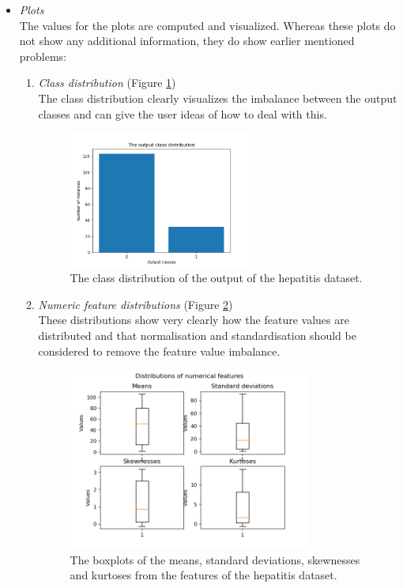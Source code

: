 \documentclass[10pt,a4paper]{report}
\begin{document}
\begin{itemize}
		\item \textit{Plots} \\
		
		The values for the plots are computed and visualized. Whereas these plots do not show any additional information, they do show earlier mentioned problems:
		
		\begin{enumerate}
			\item \textit{Class distribution} (Figure \ref{fig:HepClass})\\
			The class distribution clearly visualizes the imbalance between the output classes and can give the user ideas of how to deal with this.
			
			\begin{figure}[H]
				\centering
				\includegraphics[width=0.6\textwidth]{Hep_Class.png}
				\caption{The class distribution of the output of the hepatitis dataset.}
				\label{fig:HepClass}
			\end{figure}
			
			\item \textit{Numeric feature distributions} (Figure \ref{fig:HepDist}) \\
			These distributions show very clearly how the feature values are distributed and that normalisation and standardisation should be considered to remove the feature value imbalance.
			
			\begin{figure}[H]
				\centering
				\includegraphics[width=0.8\textwidth]{Hep_Dist.png}
				\caption{The boxplots of the means, standard deviations, skewnesses and kurtoses from the features of the hepatitis dataset.}
				\label{fig:HepDist}
			\end{figure}
			

\end{enumerate}
\end{itemize}
\end{document}
